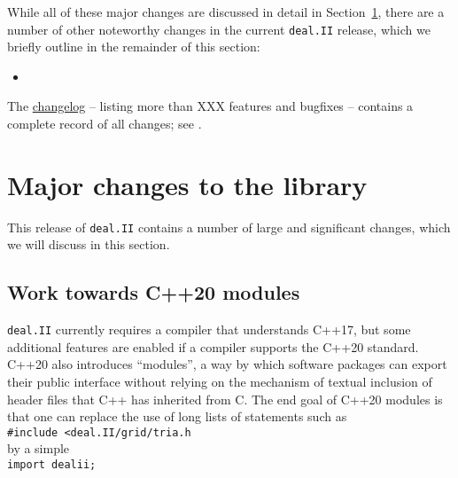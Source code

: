 \documentclass{ansarticle-preprint}
\newcommand{\specialword}[1]{\texttt{#1}}
\newcommand{\dealii}{{\specialword{deal.II}}\xspace}
\begin{document}
While all of these major changes are discussed in detail in
Section~\ref{sec:major}, there
are a number of other noteworthy changes in the current \dealii release,
which we briefly outline in the remainder of this section:
%
\begin{itemize}
\item
{}
\end{itemize}
%
The
\href{https://dealii.org/developer/doxygen/deal.II/changes_between_9_5_2_and_9_6_0.html}{changelog}
-- listing more than XXX
features and bugfixes --
contains a complete record of all changes; see \cite{changes97}.



\section{Major changes to the library}
\label{sec:major}

This release of \dealii contains a number of large and significant changes,
which we will discuss in this section.



\subsection{Work towards C++20 modules}
\label{subsec:modules}

\dealii{} currently requires a compiler that understands C++17, but
some additional features are enabled if a compiler supports the C++20
standard. C++20 also introduces ``modules'', a way by which software
packages can export their public interface without relying on the
mechanism of textual inclusion of header files that C++ has inherited from C. The
end goal of C++20 modules is that one can replace the use of long
lists of statements such as\\
\hspace*{1cm}\texttt{\#include <deal.II/grid/tria.h}\\
by a simple\\
\hspace*{1cm}\texttt{import dealii;}
\end{document}
